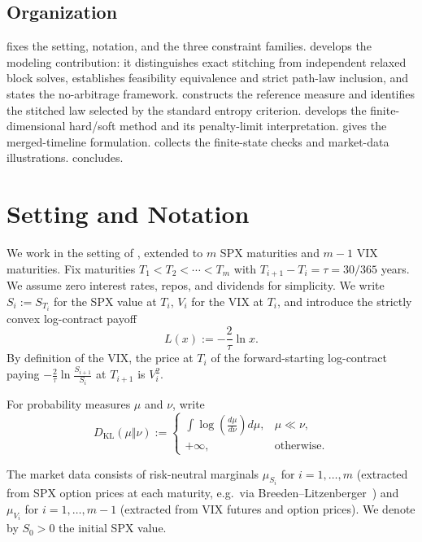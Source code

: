 \documentclass{article}
\begin{document}
\subsection{Organization}\label{subsec:organization}

 fixes the setting, notation, and the three constraint families.
 develops the modeling contribution: it distinguishes exact stitching from independent relaxed block solves, establishes feasibility equivalence and strict path-law inclusion, and states the no-arbitrage framework.
 constructs the reference measure and identifies the stitched law selected by the standard entropy criterion.
 develops the finite-dimensional hard/soft method and its penalty-limit interpretation.
 gives the merged-timeline formulation.
 collects the finite-state checks and market-data illustrations.
 concludes.

\section{Setting and Notation}\label{sec:setting}

We work in the setting of \citet{guyon2020joint}, extended to $m$ SPX maturities and $m-1$ VIX maturities.
Fix maturities $T_1 < T_2 < \cdots < T_m$ with $T_{i+1} - T_i = \tau = 30/365$ years.
We assume zero interest rates, repos, and dividends for simplicity.
We write $S_i := S_{T_i}$ for the SPX value at $T_i$, $V_i$ for the VIX at $T_i$, and introduce the strictly convex log-contract payoff
\begin{equation}\label{eq:log_contract}
    L(x) := -\frac{2}{\tau}\ln x.
\end{equation}
By definition of the VIX, the price at $T_i$ of the forward-starting log-contract paying $-\frac{2}{\tau}\ln\frac{S_{i+1}}{S_i}$ at $T_{i+1}$ is $V_i^2$.

For probability measures $\mu$ and $\nu$, write
\[
D_{\mathrm{KL}}(\mu\Vert\nu)
:=
\begin{cases}
\displaystyle\int\log\!\left(\frac{d\mu}{d\nu}\right)d\mu,
& \mu\ll\nu,\\[4pt]
+\infty, & \text{otherwise}.
\end{cases}
\]

The market data consists of risk-neutral marginals $\mu_{S_i}$ for $i=1,\ldots,m$ (extracted from SPX option prices at each maturity, e.g.\ via Breeden--Litzenberger~\citep{breeden1978prices}) and $\mu_{V_i}$ for $i=1,\ldots,m-1$ (extracted from VIX futures and option prices).
We denote by $S_0 > 0$ the initial SPX value.
\end{document}
